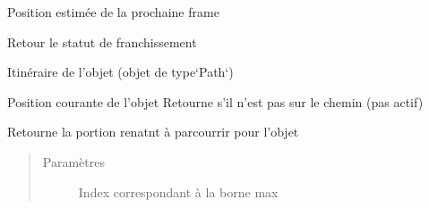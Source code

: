 \documentclass[a4paper,10pt,french]{sphinxmanual}
\begin{document}
\begin{fulllineitems}
\begin{fulllineitems}
\end{fulllineitems}


\begin{fulllineitems}
\label{\detokenize{road_objects/road_item:road_objects.road_item.RoadItem.next_position}}
Position estimée de la prochaine frame

\end{fulllineitems}


\begin{fulllineitems}
\label{\detokenize{road_objects/road_item:road_objects.road_item.RoadItem.passable}}
Retour le statut de franchissement

\end{fulllineitems}


\begin{fulllineitems}
\label{\detokenize{road_objects/road_item:road_objects.road_item.RoadItem.path}}
Itinéraire de l’objet  (objet de type{}`Path{}`)

\end{fulllineitems}


\begin{fulllineitems}
\label{\detokenize{road_objects/road_item:road_objects.road_item.RoadItem.position}}
Position courante de l’objet 
Retourne  s’il n’est pas sur le chemin (pas actif)

\end{fulllineitems}


\begin{fulllineitems}
\label{\detokenize{road_objects/road_item:road_objects.road_item.RoadItem.remain_path}}
Retourne la portion renatnt à parcourrir pour l’objet 
\begin{quote}\begin{description}
\item[{Paramètres}] \leavevmode
{} \textendash{} Index correspondant à la borne max


\end{description}
\end{quote}
\end{fulllineitems}
\end{fulllineitems}
\end{document}
